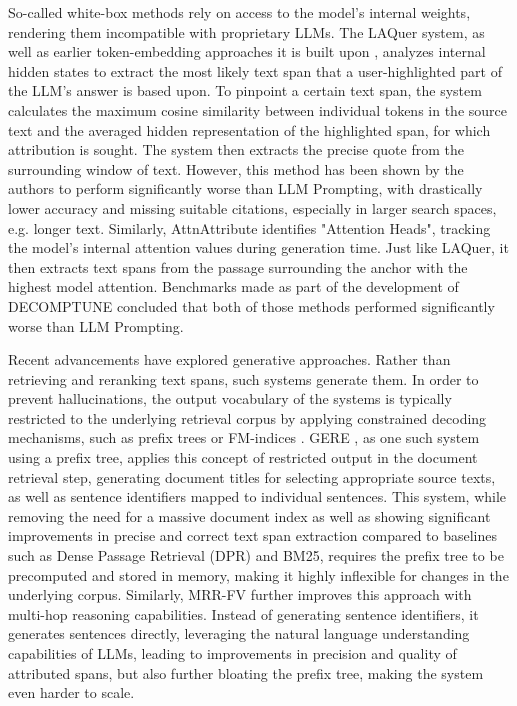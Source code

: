 So-called white-box methods rely on access to the model's internal weights, rendering them incompatible with proprietary LLMs. The LAQuer \cite{laquer} system, as well as earlier token-embedding approaches it is built upon \cite{peeringIntoTheMindOfLanguageModels}, analyzes internal hidden states to extract the most likely text span that a user-highlighted part of the LLM's answer is based upon. To pinpoint a certain text span, the system calculates the maximum cosine similarity between individual tokens in the source text and the averaged hidden representation of the highlighted span, for which attribution is sought. The system then extracts the precise quote from the surrounding window of text. However, this method has been shown by the authors to perform significantly worse than LLM Prompting, with drastically lower accuracy and missing suitable citations, especially in larger search spaces, e.g. longer text. 
Similarly, AttnAttribute \cite{onMechanisticCircuitsForExtractiveQuestions} identifies "Attention Heads", tracking the model's internal attention values during generation time. Just like LAQuer, it then extracts text spans from the passage surrounding the anchor with the highest model attention. 
Benchmarks made as part of the development of DECOMPTUNE \cite{decompositionEnhancedTraining} concluded that both of those methods performed significantly worse than LLM Prompting.

Recent advancements have explored generative approaches. Rather than retrieving and reranking text spans, such systems generate them. In order to prevent hallucinations, the output vocabulary of the systems is typically restricted to the underlying retrieval corpus by applying constrained decoding mechanisms, such as prefix trees or FM-indices \cite{autoregressiveSeachEnginesSeal}. 
GERE \cite{generativeEvidenceRetrievalForFactVerification}, as one such system using a prefix tree, applies this concept of restricted output in the document retrieval step, generating document titles for selecting appropriate source texts, as well as sentence identifiers mapped to individual sentences. This system, while removing the need for a massive document index as well as showing significant improvements in precise and correct text span extraction compared to baselines such as Dense Passage Retrieval (DPR) and BM25, requires the prefix tree to be precomputed and stored in memory, making it highly inflexible for changes in the underlying corpus.  
Similarly, MRR-FV \cite{mrr-fv} further improves this approach with multi-hop reasoning capabilities. Instead of generating sentence identifiers, it generates sentences directly, leveraging the natural language understanding capabilities of LLMs, leading to improvements in precision and quality of attributed spans, but also further bloating the prefix tree, making the system even harder to scale.

